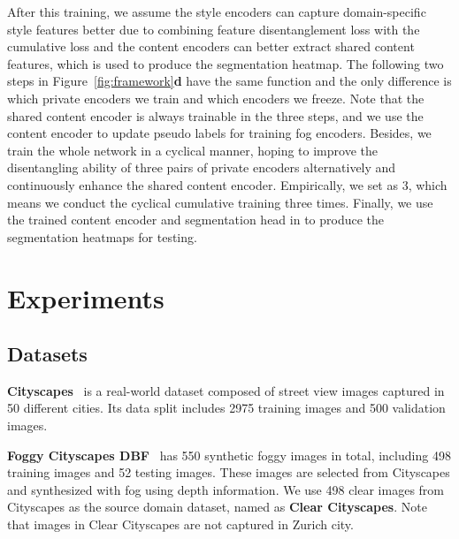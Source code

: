 \documentclass[10pt,twocolumn,letterpaper]{article}
\begin{document}
After this training, we assume the style encoders can capture domain-specific style features better due to combining feature disentanglement loss  with the cumulative loss  and the content encoders can better extract shared content features, which is used to produce the segmentation heatmap. 
The following two steps in Figure~\ref{fig:framework}\textbf{d} have the same function and the only difference is which private encoders we train and which encoders we freeze. Note that the shared content encoder is always trainable in the three steps, and we use the content encoder to update pseudo labels for training fog encoders. Besides, we train the whole network in a cyclical manner, hoping to improve the disentangling ability of three pairs of private encoders alternatively and continuously enhance the shared content encoder. Empirically, we set  as 3, which means we conduct the cyclical cumulative training three times. Finally, we use the trained content encoder and segmentation head  in  to produce the segmentation heatmaps for testing.











































\section{Experiments}
\subsection{Datasets}
\noindent\textbf{Cityscapes}~\cite{marius2016cityscapes} is a real-world dataset composed of street view images captured in 50 different cities. Its data split includes 2975 training images and 500 validation images.


\noindent\textbf{Foggy Cityscapes DBF}~\cite{sakaridis2018semantic} has 550 synthetic foggy images in total, including 498 training images and 52 testing images. These images are selected from Cityscapes and synthesized with fog using depth information. We use 498 clear images from Cityscapes as the source domain dataset, named as \textbf{Clear Cityscapes}. Note that images in Clear Cityscapes are not captured in Zurich city.
    
\end{document}
